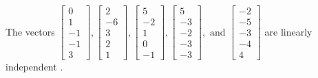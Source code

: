 \begin{exercise}
\begin{exerciseStatement}
  \end{exerciseStatement}
  \begin{exerciseAnswer}
   The vectors \(\left[\begin{array}{r}
0 \\
1 \\
-1 \\
-1 \\
3
\end{array}\right] , \left[\begin{array}{r}
2 \\
-6 \\
3 \\
2 \\
1
\end{array}\right] , \left[\begin{array}{r}
5 \\
-2 \\
1 \\
0 \\
-1
\end{array}\right] , \left[\begin{array}{r}
5 \\
-3 \\
-2 \\
-3 \\
-3
\end{array}\right] , \text{ and } \left[\begin{array}{r}
-2 \\
-5 \\
-3 \\
-4 \\
4
\end{array}\right]\) are 
  	 linearly independent  .
  


  \end{exerciseAnswer}
\end{exercise}
